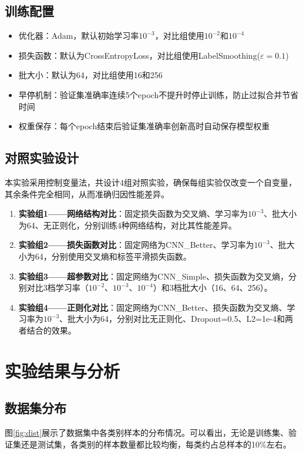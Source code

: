 \documentclass[12pt,a4paper]{ctexart}
\begin{document}
\subsection{训练配置}
\begin{itemize}
  \item 优化器：Adam，默认初始学习率$10^{-3}$，对比组使用$10^{-2}$和$10^{-4}$
  \item 损失函数：默认为CrossEntropyLoss，对比组使用LabelSmoothing($\varepsilon=0.1$)
  \item 批大小：默认为64，对比组使用16和256
  \item 早停机制：验证集准确率连续5个epoch不提升时停止训练，防止过拟合并节省时间
  \item 权重保存：每个epoch结束后验证集准确率创新高时自动保存模型权重
\end{itemize}

\subsection{对照实验设计}
本实验采用控制变量法，共设计4组对照实验，确保每组实验仅改变一个自变量，其余条件完全相同，从而准确归因性能差异。

\begin{enumerate}
  \item \textbf{实验组1——网络结构对比}：固定损失函数为交叉熵、学习率为$10^{-3}$、批大小为64、无正则化，分别训练4种网络结构，对比其性能差异。
  \item \textbf{实验组2——损失函数对比}：固定网络为CNN\_Better、学习率为$10^{-3}$、批大小为64，分别使用交叉熵和标签平滑损失函数。
  \item \textbf{实验组3——超参数对比}：固定网络为CNN\_Simple、损失函数为交叉熵，分别对比3档学习率（$10^{-2}$、$10^{-3}$、$10^{-4}$）和3档批大小（16、64、256）。
  \item \textbf{实验组4——正则化对比}：固定网络为CNN\_Better、损失函数为交叉熵、学习率为$10^{-3}$、批大小为64，分别对比无正则化、Dropout=0.5、L2=1e-4和两者结合的效果。
\end{enumerate}

\section{实验结果与分析}

\subsection{数据集分布}
图\ref{fig:dist}展示了数据集中各类别样本的分布情况。可以看出，无论是训练集、验证集还是测试集，各类别的样本数量都比较均衡，每类约占总样本的10\%左右。
\end{document}
